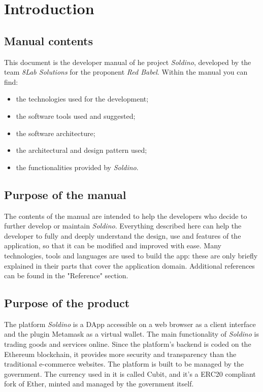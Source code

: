 \section{Introduction} 
\subsection{Manual contents}
This document is the developer manual of he project \textit{Soldino}, developed by the team \textit{8Lab Solutions} for the proponent \textit{Red Babel}.\newline
Within the manual you can find:
\begin{itemize}
	\item the technologies used for the development;
	\item the software tools used and suggested;
	\item the software architecture;
	\item the architectural and design pattern used;
	\item the functionalities provided by \textit{Soldino}.
\end{itemize}

\subsection{Purpose of the manual}
The contents of the manual are intended to help the developers who decide to further develop or maintain \textit{Soldino}. Everything described here can help the developer to fully and deeply understand the design, use and features of the application, so that it can be modified and improved with ease.\newline
Many technologies, tools and languages are used to build the app: these are only briefly explained in their parts that cover the application domain. Additional references can be found in the "Reference" section.

\subsection{Purpose of the product}
The platform \textit{Soldino} is a DApp accessible on a web browser as a client interface and the plugin Metamask as a virtual wallet.\newline
The main functionality of \textit{Soldino} is trading goods and services online. Since the platform's backend is coded on the Ethereum blockchain, it provides more security and transparency than the traditional e-commerce websites.\newline
The platform is built to be managed by the government. The currency used in it is called Cubit, and it's a ERC20 compliant fork of Ether, minted and managed by the government itself.


